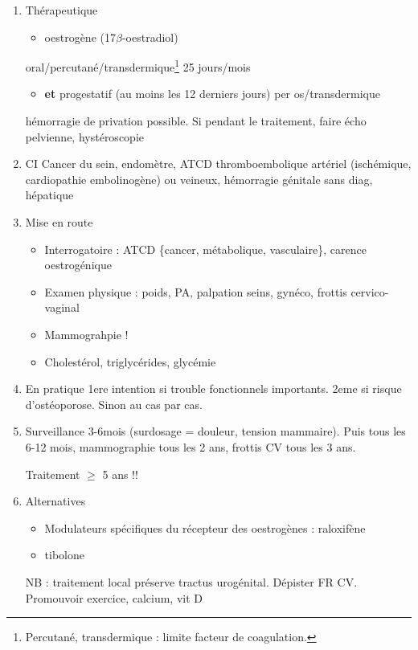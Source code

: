\documentclass[11pt]{article}
\begin{document}
\begin{enumerate}
\item Thérapeutique
\label{sec:org8fbf47b}
\begin{itemize}
\item oestrogène (17\(\beta\)-oestradiol)
\end{itemize}
oral/percutané/transdermique\footnote{Percutané, transdermique : limite \inc facteur de coagulation.} 25 jours/mois
\begin{itemize}
\item \textbf{et} progestatif (au moins les 12 derniers jours) per os/transdermique
\end{itemize}
\danger hémorragie de privation possible. Si pendant le traitement, faire écho
pelvienne, hystéroscopie

\item CI
\label{sec:org80681bb}
Cancer du sein, endomètre, ATCD thromboembolique artériel (ischémique,
cardiopathie embolinogène) ou veineux, hémorragie génitale sans diag, hépatique

\item Mise en route
\label{sec:org6d728bd}
\begin{itemize}
\item Interrogatoire : ATCD \{cancer, métabolique, vasculaire\}, carence oestrogénique
\item Examen physique : poids, PA, palpation seins, gynéco, frottis cervico-vaginal
\item Mammograhpie !
\item Cholestérol, triglycérides, glycémie
\end{itemize}

\item En pratique
\label{sec:org8c6b76b}
1ere intention si trouble fonctionnels importants. 2eme si risque
d'ostéoporose. Sinon au cas par cas.

\item Surveillance
\label{sec:orgf2d639e}
3-6mois (surdosage = douleur, tension mammaire). Puis tous les 6-12 mois,
mammographie tous les 2 ans, frottis CV tous les 3 ans.

Traitement \(\ge\) 5 ans !!

\item Alternatives
\label{sec:org256f2ea}
\begin{itemize}
\item Modulateurs spécifiques du récepteur des oestrogènes : raloxifène
\item tibolone
\end{itemize}

NB : traitement local préserve tractus urogénital. Dépister FR CV. Promouvoir
exercice, calcium, vit D
\end{enumerate}
\end{document}
